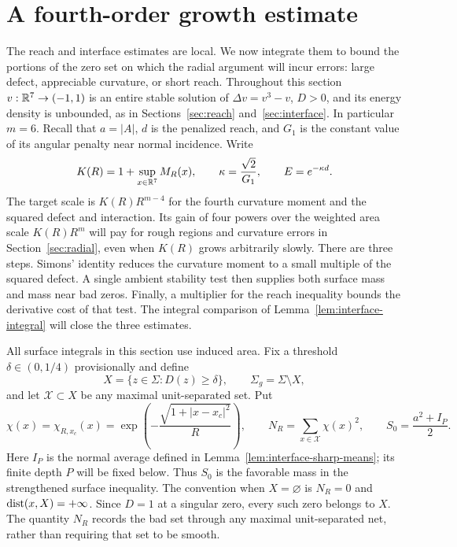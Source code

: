 \section{A fourth-order growth estimate}\label{sec:growth}

The reach and interface estimates are local.  We now integrate them to
bound the portions of the zero set on which the radial argument will
incur errors: large defect, appreciable curvature, or short reach.
Throughout this section $v:\mathbb R^7\to(-1,1)$ is an entire stable solution
of $\Delta v=v^3-v$, $D>0$, and its energy density is unbounded, as in
Sections~\ref{sec:reach} and~\ref{sec:interface}.  In particular $m=6$.
Recall that $a=|A|$, $d$ is the penalized reach, and $G_1$ is the
constant value of its angular penalty near normal incidence.  Write
\[
 K(R)=1+\sup_{x\in\mathbb R^7}M_R(x),\qquad
 \kappa=\frac{\sqrt2}{G_1},\qquad E=e^{-\kappa d}.
\]
The target scale is $K(R)R^{m-4}$ for the fourth curvature moment and
the squared defect and interaction.  Its gain of four powers over the
weighted area scale $K(R)R^m$ will pay for rough regions and curvature
errors in Section~\ref{sec:radial}, even when $K(R)$ grows arbitrarily
slowly.  There are three steps.  Simons' identity reduces the curvature
moment to a small multiple of the squared defect.  A single ambient
stability test then supplies both surface mass and mass near bad zeros.
Finally, a multiplier for the reach inequality bounds the derivative
cost of that test.  The integral comparison of
Lemma~\ref{lem:interface-integral} will close the three estimates.

All surface integrals in this section use induced area.  Fix a threshold
$\delta\in(0,1/4)$ provisionally and define
\[
 X=\{z\in\Sigma:D(z)\ge\delta\},\qquad
 \Sigma_g=\Sigma\setminus X,
\]
and let $\mathcal X\subset X$ be any maximal unit-separated set.  Put
\[
 \chi(x)=\chi_{R,x_c}(x)
 =\exp\!\left(-\frac{\sqrt{1+|x-x_c|^2}}R\right),\qquad
 N_R=\sum_{x\in\mathcal X}\chi(x)^2,
 \qquad S_0=\frac{a^2+I_P}{2}.
\]
Here $I_P$ is the normal average defined in
Lemma~\ref{lem:interface-sharp-means}; its finite depth $P$ will be fixed
below.  Thus $S_0$ is the favorable mass in the strengthened surface
inequality.  The convention when $X=\varnothing$ is $N_R=0$ and
$\operatorname{dist}(x,X)=+\infty$.  Since $D=1$ at a singular zero, every such zero
belongs to $X$.  The quantity $N_R$ records the bad set through any
maximal unit-separated net, rather than requiring that set to be smooth.

